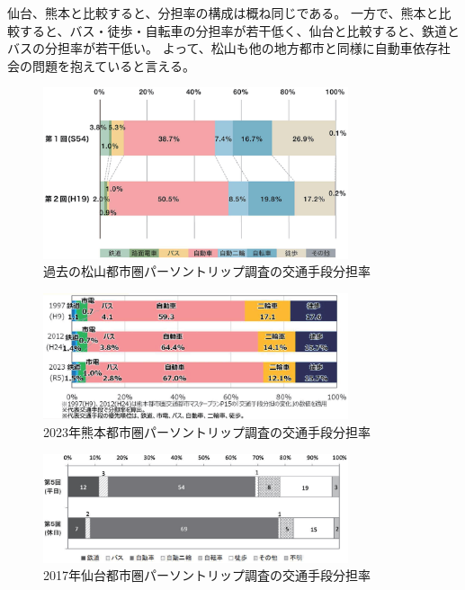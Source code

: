 \documentclass[a4paper,12pt, uplatex]{jsbook}
\begin{document}
仙台、熊本と比較すると、分担率の構成は概ね同じである。
一方で、熊本と比較すると、バス・徒歩・自転車の分担率が若干低く、仙台と比較すると、鉄道とバスの分担率が若干低い。
よって、松山も他の地方都市と同様に自動車依存社会の問題を抱えていると言える。

\begin{figure}[htbp]
    \centering
    \includegraphics[width=0.8\textwidth]{picture/mode_past.eps}
    \caption{過去の松山都市圏パーソントリップ調査の交通手段分担率}
    \label{fig:mode_past}
\end{figure}

\begin{figure}[htbp]
    \centering
    \includegraphics[width=0.8\textwidth]{picture/mode_kumamoto.eps}
    \caption{2023年熊本都市圏パーソントリップ調査の交通手段分担率\cite{kumamoto}}
    \label{fig:mode_kumamoto}
\end{figure}

\begin{figure}[htbp]
    \centering
    \includegraphics[width=0.8\textwidth]{picture/mode_sendai.eps}
    \caption{2017年仙台都市圏パーソントリップ調査の交通手段分担率\cite{sendai}}
    \label{fig:mode_sendai}
\end{figure}
\end{document}

